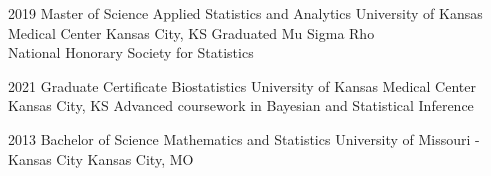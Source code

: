 
\EducationSidebarExtra
{2019}
{Master of Science}
{Applied Statistics and Analytics}
{University of Kansas Medical Center}
{Kansas City, KS}
{Graduated Mu Sigma Rho\\ National Honorary Society for Statistics}

\vspace*{0.1 in}

\EducationSidebarExtra
{2021}
{Graduate Certificate}
{Biostatistics}
{University of Kansas Medical Center}
{Kansas City, KS}
{Advanced coursework in Bayesian and Statistical Inference}

\vspace*{0.1 in}

\EducationSidebar
{2013}
{Bachelor of Science}
{Mathematics and Statistics}
{University of Missouri - Kansas City}
{Kansas City, MO}